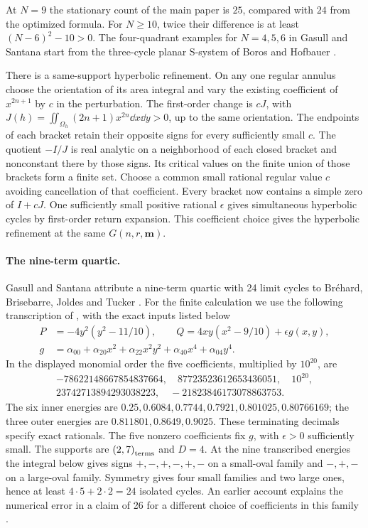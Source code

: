 At \(N=9\) the stationary count of the main paper is \(25\), compared with \(24\) from the optimized formula. For \(N\ge10\), twice their difference is at least \((N-6)^2-10>0\). The four-quadrant examples for \(N=4,5,6\) in Gasull and Santana start from the three-cycle planar S-system of Boros and Hofbauer \cite[\S7]{BorosHofbauer2019}.

There is a same-support hyperbolic refinement. On any one regular annulus choose the orientation of its area integral and vary the existing coefficient of \(x^{2n+1}\) by \(c\) in the perturbation. The first-order change is \(cJ\), with \(J(h)=\iint_{\Omega_h}(2n+1)x^{2n}\dd x\dd y>0\), up to the same orientation. The endpoints of each bracket retain their opposite signs for every sufficiently small \(c\). The quotient \(-I/J\) is real analytic on a neighborhood of each closed bracket and nonconstant there by those signs. Its critical values on the finite union of those brackets form a finite set. Choose a common small rational regular value \(c\) avoiding cancellation of that coefficient. Every bracket now contains a simple zero of \(I+cJ\). One sufficiently small positive rational \(\epsilon\) gives simultaneous hyperbolic cycles by first-order return expansion. This coefficient choice gives the hyperbolic refinement at the same \(G(n,r,\mathbf m)\).

\paragraph{The nine-term quartic.}
Gasull and Santana \cite[\S1]{GasullSantana2024} attribute a nine-term quartic with 24 limit cycles to Br\'ehard, Brisebarre, Joldes and Tucker \cite[\S7.1]{BBJT2024}. For the finite calculation we use the following transcription of \cite[\S7.1, (7.2), Table~2]{BBJT2024}, with the exact inputs listed below
\[
 \begin{aligned}P&=-4y^2(y^2-11/10),\qquad Q=4xy(x^2-9/10)+\epsilon g(x,y),\\
 g&=\alpha_{00}+\alpha_{20}x^2+\alpha_{22}x^2y^2+\alpha_{40}x^4+\alpha_{04}y^4 .\end{aligned}
\]
In the displayed monomial order the five coefficients, multiplied by \(10^{20}\), are
\[
 \begin{gathered}
 -78622148667854837664,\quad 87723523612653436051,\quad 10^{20},\\
 23742713894293038223,\quad -21823846173078863753 .
 \end{gathered}
\]
The six inner energies are \(0.25,0.6084,0.7744,0.7921,0.801025,0.80766169\); the three outer energies are \(0.811801,0.8649,0.9025\). These terminating decimals specify exact rationals. The five nonzero coefficients fix \(g\), with \(\epsilon>0\) sufficiently small. The supports are \(\left(2,7\right)_{\mathrm{terms}}\) and \(D=4\). At the nine transcribed energies the integral below gives signs \(+,-,+,-,+,-\) on a small-oval family and \(-,+,-\) on a large-oval family. Symmetry gives four small families and two large ones, hence at least \(4\cdot5+2\cdot2=24\) isolated cycles. An earlier account explains the numerical error in a claim of 26 for a different choice of coefficients in this family \cite[\S6.2]{BrehardMahboubiPous2019}.

